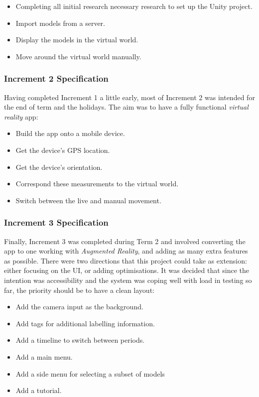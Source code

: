 \documentclass{article}
\begin{document}
\begin{itemize}
    \item Completing all initial research necessary research to set up the Unity project.
    \item Import models from a server.
    \item Display the models in the virtual world.
    \item Move around the virtual world manually. 
\end{itemize} 

\subsubsection{Increment 2 Specification}
Having completed Increment 1 a little early, most of Increment 2 was intended for the end of term and the holidays. The aim was to have a fully functional \textit{virtual reality} app: 
\begin{itemize}
    \item Build the app onto a mobile device.
    \item Get the device's GPS location.
    \item Get the device's orientation. 
    \item Correspond these measurements to the virtual world.
    \item Switch between the live and manual movement.
\end{itemize} 

\subsubsection{Increment 3 Specification}
\label{increment3}
Finally, Increment 3 was completed during Term 2 and involved converting the app to one working with \textit{Augmented Reality}, and adding as many extra features as possible. There were two directions that this project could take as extension: either focusing on the UI, or adding optimisations. It was decided that since the intention was accessibility and the system was coping well with load in testing so far, the priority should be to have a clean layout:
\begin{itemize}
    \item Add the camera input as the background.
    \item Add tags for additional labelling information.
    \item Add a timeline to switch between periods. 
    \item Add a main menu.
    \item Add a side menu for selecting a subset of models
    \item Add a tutorial.
\end{itemize} 
\end{document}
